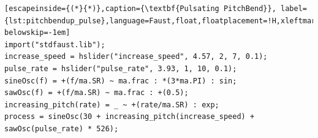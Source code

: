 \documentclass{article} %
\begin{document}
\begin{lstlisting}[escapeinside={(*}{*)},caption={\textbf{Pulsating PitchBend}}, label={lst:pitchbendup_pulse},language=Faust,float,floatplacement=!H,xleftmargin=1em,xrightmargin=0.5em,firstnumber=0,aboveskip=0em, belowskip=-1em]
import("stdfaust.lib");
increase_speed = hslider("increase_speed", 4.57, 2, 7, 0.1);
pulse_rate = hslider("pulse_rate", 3.93, 1, 10, 0.1);
sineOsc(f) = +(f/ma.SR) ~ ma.frac : *(3*ma.PI) : sin;
sawOsc(f) = +(f/ma.SR) ~ ma.frac : +(0.5);
increasing_pitch(rate) = _ ~ +(rate/ma.SR) : exp;
process = sineOsc(30 + increasing_pitch(increase_speed) + sawOsc(pulse_rate) * 526);
\end{lstlisting}


\clearpage


\end{document}
